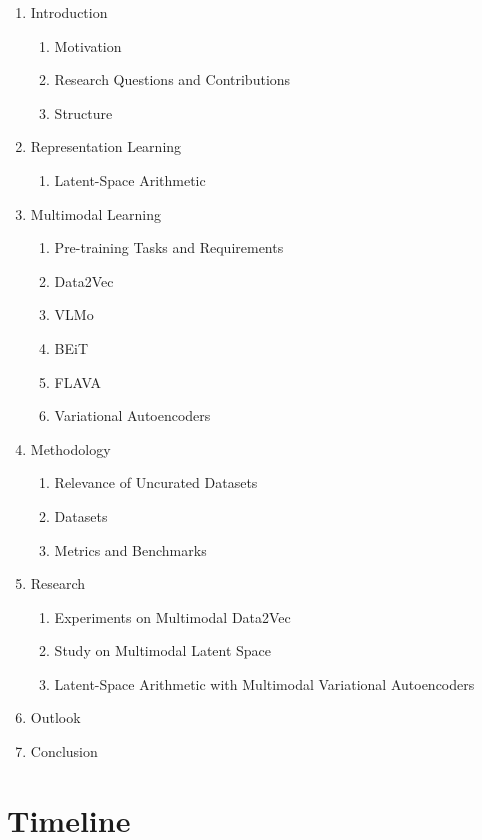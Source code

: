 \begin{enumerate}
    \item Introduction
        \begin{enumerate}
            \item Motivation
            \item Research Questions and Contributions
            \item Structure
        \end{enumerate}
    \item Representation Learning
        \begin{enumerate}
            \item Latent-Space Arithmetic
        \end{enumerate}
    \item Multimodal Learning
        \begin{enumerate}
            \item Pre-training Tasks and Requirements
            \item Data2Vec
            \item VLMo
            \item BEiT
            \item FLAVA
            \item Variational Autoencoders
        \end{enumerate}
    \item Methodology
        \begin{enumerate}
            \item Relevance of Uncurated Datasets
            \item Datasets
            \item Metrics and Benchmarks
        \end{enumerate}
    \item Research
        \begin{enumerate}
            \item Experiments on Multimodal Data2Vec
            \item Study on Multimodal Latent Space
            \item Latent-Space Arithmetic with Multimodal Variational Autoencoders
        \end{enumerate}
    \item Outlook
    \item Conclusion
\end{enumerate}

\section{Timeline}